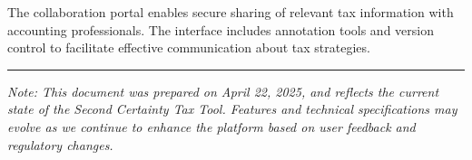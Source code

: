 \documentclass[
  11pt,
  letterpaper,
]{article}
\begin{document}
The collaboration portal enables secure sharing of relevant tax
information with accounting professionals. The interface includes
annotation tools and version control to facilitate effective
communication about tax strategies.

\begin{center}\rule{0.5\linewidth}{0.5pt}\end{center}

\emph{Note: This document was prepared on April 22, 2025, and reflects
the current state of the Second Certainty Tax Tool. Features and
technical specifications may evolve as we continue to enhance the
platform based on user feedback and regulatory changes.}
\end{document}
